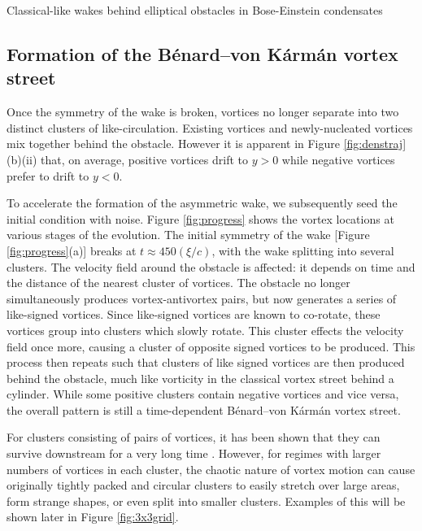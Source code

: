 \begin{chapter}{\label{cha:wake}Classical-like wakes behind elliptical obstacles in Bose-Einstein condensates}
\subsection{Formation of the B\'enard--von K\'arm\'an vortex street}
Once the symmetry of the wake is broken, vortices no longer separate into two distinct clusters of like-circulation. Existing vortices and newly-nucleated vortices mix together behind the obstacle. However it is apparent in Figure \ref{fig:denstraj}(b)(ii) that, on average, positive vortices drift to $y>0$ while negative vortices prefer to drift to $y<0$. 

To accelerate the formation of the asymmetric wake, we subsequently seed the initial condition with noise.  Figure \ref{fig:progress} shows the vortex locations at various stages of the evolution. The initial symmetry of the wake [Figure \ref{fig:progress}(a)] breaks at $t \approx 450 (\xi/c)$, with the wake splitting into several clusters. The velocity field around the obstacle is affected: it depends on time and the distance of the nearest cluster of vortices. The obstacle no longer simultaneously produces vortex-antivortex pairs, but now generates a series of like-signed vortices.  Since like-signed vortices are known to co-rotate, these vortices group into clusters which slowly rotate.  This cluster effects the velocity field once more, causing a cluster of opposite signed vortices to be produced. This process then repeats such that clusters of like signed vortices are then produced behind the obstacle, much like vorticity in the classical vortex street behind a cylinder.  While some positive clusters contain negative vortices and vice versa, the overall pattern is still a time-dependent B\'enard--von K\'arm\'an vortex street.

For clusters consisting of pairs of vortices, it has been shown that they can survive downstream for a very long time \cite{saito10}.  However, for regimes with larger numbers of vortices in each cluster, the chaotic nature of vortex motion can cause originally tightly packed and circular clusters to easily stretch over large areas, form strange shapes, or even split into smaller clusters. Examples of this will be shown later in Figure \ref{fig:3x3grid}.



\end{chapter}

